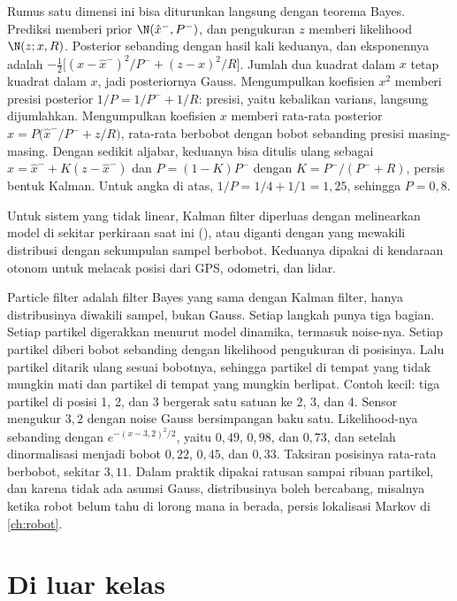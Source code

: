 Rumus satu dimensi ini bisa diturunkan langsung dengan teorema Bayes. Prediksi memberi prior
$\N(\hat x^-,P^-)$, dan pengukuran $z$ memberi likelihood $\N(z;x,R)$. Posterior sebanding dengan hasil kali
keduanya, dan eksponennya adalah
$-\tfrac12\big[(x-\hat x^-)^2/P^-+(z-x)^2/R\big]$. Jumlah dua kuadrat dalam $x$ tetap kuadrat dalam $x$, jadi
posteriornya Gauss. Mengumpulkan koefisien $x^2$ memberi presisi posterior $1/P=1/P^-+1/R$: presisi,
yaitu kebalikan varians, langsung dijumlahkan. Mengumpulkan koefisien $x$ memberi rata-rata posterior
$\hat x=P\big(\hat x^-/P^-+z/R\big)$, rata-rata berbobot dengan bobot sebanding presisi masing-masing.
Dengan sedikit aljabar, keduanya bisa ditulis ulang sebagai $\hat x=\hat x^-+K(z-\hat x^-)$ dan
$P=(1-K)P^-$ dengan $K=P^-/(P^-+R)$, persis bentuk Kalman. Untuk angka di atas, $1/P=1/4+1/1=1{,}25$,
sehingga $P=0{,}8$.

Untuk sistem yang tidak linear, Kalman filter diperluas dengan melinearkan model di sekitar perkiraan
saat ini (), atau diganti dengan  yang mewakili
distribusi dengan sekumpulan sampel berbobot. Keduanya dipakai di kendaraan otonom untuk melacak
posisi dari GPS, odometri, dan lidar.

Particle filter adalah filter Bayes yang sama dengan Kalman filter, hanya distribusinya diwakili sampel, bukan Gauss. Setiap langkah
punya tiga bagian. Setiap partikel digerakkan menurut model dinamika, termasuk noise-nya. Setiap partikel diberi bobot sebanding dengan
likelihood pengukuran di posisinya. Lalu partikel ditarik ulang sesuai bobotnya, sehingga partikel di tempat yang tidak mungkin mati dan
partikel di tempat yang mungkin berlipat. Contoh kecil: tiga partikel di posisi 1, 2, dan 3 bergerak satu satuan ke 2, 3, dan 4. Sensor
mengukur $3{,}2$ dengan noise Gauss bersimpangan baku satu. Likelihood-nya sebanding dengan $e^{-(x-3{,}2)^2/2}$, yaitu $0{,}49$, $0{,}98$, dan
$0{,}73$, dan setelah dinormalisasi menjadi bobot $0{,}22$, $0{,}45$, dan $0{,}33$. Taksiran posisinya rata-rata berbobot, sekitar $3{,}11$.
Dalam praktik dipakai ratusan sampai ribuan partikel, dan karena tidak ada asumsi Gauss, distribusinya boleh bercabang, misalnya ketika
robot belum tahu di lorong mana ia berada, persis lokalisasi Markov di \cref{ch:robot}.

\section{Di luar kelas}

